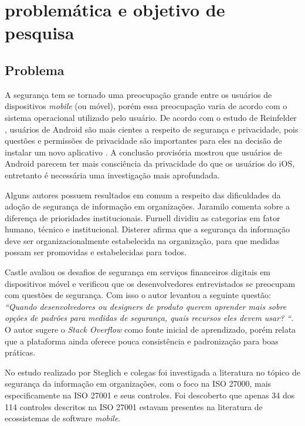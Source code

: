 \chapter{\label{chap:intro}problemática e objetivo de pesquisa}


\section{Problema}

A segurança tem se tornado uma preocupação grande entre os usuários de dispositivos \textit{mobile} (ou móvel), porém essa preocupação varia de acordo com o sistema operacional utilizado pelo usuário. De acordo com o estudo de Reinfelder \cite{reinfelder2014differences}, usuários de Android são mais cientes a respeito de segurança e  privacidade, pois questões e permissões de privacidade são importantes para eles na decisão de instalar um novo aplicativo . A conclusão provisória mostrou que usuários de Android parecem ter mais consciência da privacidade do que os usuários do iOS, entretanto é necessária uma investigação mais aprofundada.


Alguns autores possuem resultados em comum a respeito das dificuldades da adoção de segurança de informação em organizações. Jaramilo \cite{jaramillo2013cross} comenta sobre a diferença de prioridades institucionais. Furnell \cite{furnell2009integrated} dividiu as categorias em fator humano, técnico e institucional. Disterer \cite{disterer2013} afirma que a segurança da informação deve ser organizacionalmente estabelecida na organização, para que medidas possam ser promovidas e estabelecidas para todos.


Castle \cite{castle2016let} avaliou os desafios de segurança em serviços financeiros digitais em
dispositivos móvel e verificou que os desenvolvedores entrevistados se preocupam com questões de segurança. Com isso o autor levantou a seguinte questão: \textit{“Quando desenvolvedores ou designers de produto querem aprender mais sobre opções de padrões para medidas de segurança, quais recursos eles devem usar? “}. O autor sugere o \textit{Stack Overflow} como fonte inicial de aprendizado, porém relata que a plataforma ainda oferece pouca consistência e padronização para boas práticas.

No estudo realizado por Steglich e colegas  \cite{caio2019} foi investigada a literatura no tópico de segurança da informação em organizações, com o foco na ISO 27000, mais especificamente na ISO 27001 e seus controles. Foi descoberto que apenas 34 dos 114 controles descritos na ISO 27001 estavam presentes na literatura de ecossistemas de software \textit{mobile}.

